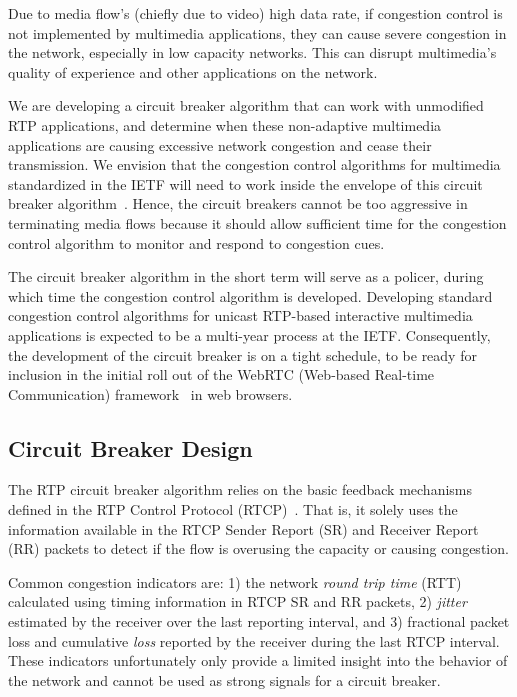 Due to media flow's (chiefly due to video) high data rate, if congestion
control is not implemented by multimedia applications, they can cause severe
congestion in the network, especially in low capacity networks. This can
disrupt multimedia's quality of experience and other applications on the
network.

We are developing a circuit breaker algorithm that can work with unmodified
RTP applications, and determine when these non-adaptive multimedia
applications are causing excessive network congestion and cease their
transmission.  We envision that the congestion control algorithms for
multimedia standardized in the IETF will need to work inside the envelope of
this circuit breaker algorithm~\cite{draft.rmcat.evaluate}. Hence, the circuit
breakers cannot be too aggressive in terminating media flows because it
should allow sufficient time for the congestion control algorithm  to monitor
and respond to congestion cues.

The circuit breaker algorithm in the short term will serve as a policer,
during which time the congestion control algorithm is developed. Developing
standard congestion control algorithms for unicast RTP-based interactive
multimedia applications is expected to be a multi-year process at the IETF.
Consequently, the development of the circuit breaker is on a tight schedule,
to be ready for inclusion in the initial roll out of the WebRTC (Web-based
Real-time Communication) framework~\cite{jennings:2013:webrtc} in web
browsers.

\subsection{Circuit Breaker Design}

The RTP circuit breaker algorithm relies on the basic feedback mechanisms
defined in the RTP Control Protocol (RTCP)~\cite{rfc3550}. That is, it solely
uses the information available in the RTCP Sender Report (SR) and Receiver
Report (RR) packets to detect if the flow is overusing the capacity or causing
congestion.

Common congestion indicators are: 1) the network \emph{round trip time} (RTT)
calculated  using timing information in RTCP SR and RR packets, 2)
\emph{jitter} estimated by the receiver over the last reporting interval, and
3) fractional packet loss and cumulative \emph{loss} reported by the receiver
during the last RTCP interval. These indicators  unfortunately only provide a
limited insight into the behavior of the network and cannot be used as strong
signals for a circuit breaker.


